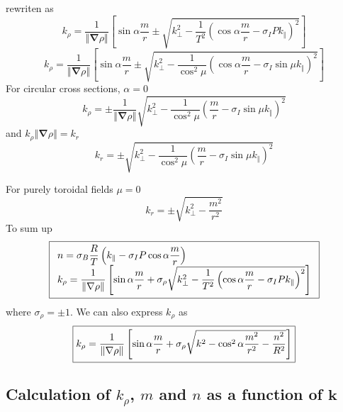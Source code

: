 \documentclass[a4paper,12pt]{article}%
\begin{document}
rewriten as%
\begin{equation}
k_{\rho}=\dfrac{1}{\left\Vert \mathbf{\nabla}\rho\right\Vert }\left[
\sin\alpha\dfrac{m}{r}\pm\sqrt{k_{\bot}^{2}-\dfrac{1}{T^{2}}\left(  \cos
\alpha\dfrac{m}{r}-\sigma_{I}Pk_{\Vert}\right)  ^{2}}\right]
\end{equation}%
\begin{equation}
k_{\rho}=\dfrac{1}{\left\Vert \mathbf{\nabla}\rho\right\Vert }\left[
\sin\alpha\dfrac{m}{r}\pm\sqrt{k_{\bot}^{2}-\dfrac{1}{\cos^{2}\mu}\left(
\cos\alpha\dfrac{m}{r}-\sigma_{I}\sin\mu k_{\Vert}\right)  ^{2}}\right]
\end{equation}
For circular cross sections, $\alpha=0$
\begin{equation}
k_{\rho}=\pm\dfrac{1}{\left\Vert \mathbf{\nabla}\rho\right\Vert }\sqrt
{k_{\bot}^{2}-\dfrac{1}{\cos^{2}\mu}\left(  \dfrac{m}{r}-\sigma_{I}\sin\mu
k_{\Vert}\right)  ^{2}}%
\end{equation}
and $k_{\rho}\left\Vert \mathbf{\nabla}\rho\right\Vert =k_{r}$%
\begin{equation}
k_{r}=\pm\sqrt{k_{\bot}^{2}-\dfrac{1}{\cos^{2}\mu}\left(  \dfrac{m}{r}%
-\sigma_{I}\sin\mu k_{\Vert}\right)  ^{2}}%
\end{equation}


For purely toroidal fields $\mu=0$%
\begin{equation}
k_{r}=\pm\sqrt{k_{\bot}^{2}-\dfrac{m^{2}}{r^{2}}}%
\end{equation}
To sum up%
\begin{equation}
\fbox{$%
\begin{array}
[c]{l}%
n=\sigma_{B}\dfrac{R}{T}\left(  k_{\Vert}-\sigma_{I}P\cos\alpha\dfrac{m}%
{r}\right) \\
k_{\rho}=\dfrac{1}{\left\Vert \mathbf{\nabla}\rho\right\Vert }\left[
\sin\alpha\dfrac{m}{r}+\sigma_{\rho}\sqrt{k_{\bot}^{2}-\dfrac{1}{T^{2}}\left(
\cos\alpha\dfrac{m}{r}-\sigma_{I}Pk_{\Vert}\right)  ^{2}}\right]
\end{array}
$}%
\end{equation}
where $\sigma_{\rho}=\pm1$. We can also express $k_{\rho}$ as
\begin{equation}
\fbox{$k_{\rho}=\dfrac{1}{\left\Vert \mathbf{\nabla}\rho\right\Vert }\left[
\sin\alpha\dfrac{m}{r}+\sigma_{\rho}\sqrt{k^{2}-\cos^{2}\alpha\dfrac{m^{2}%
}{r^{2}}-\dfrac{n^{2}}{R^{2}}}\right]  $}%
\end{equation}


\subsection{Calculation of $k_{\rho}$, $m$ and $n$ as a function of
$\mathbf{k}$}
\end{document}
